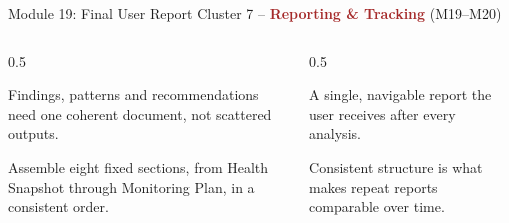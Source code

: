\documentclass[9pt,aspectratio=169]{beamer}
\begin{document}
\begin{frame}{Module 19: Final User Report}
\textcolor{black!55}{\scriptsize Cluster 7 -- \textcolor{brown}{\textbf{Reporting \& Tracking}} (M19--M20)}\\[2pt]
\begin{columns}[T,onlytextwidth]
\begin{column}{0.5\textwidth}
\begin{tcolorbox}[colback=blue!7,colframe=blue!55!black,title=\textbf{Motivation},boxrule=0.6pt,arc=1mm,left=5pt,right=5pt,top=3pt,bottom=3pt,fonttitle=\small]
\footnotesize Findings, patterns and recommendations need one coherent document, not scattered outputs.
\end{tcolorbox}
\vspace{5pt}
\begin{tcolorbox}[colback=teal!7,colframe=teal!55!black,title=\textbf{Method},boxrule=0.6pt,arc=1mm,left=5pt,right=5pt,top=3pt,bottom=3pt,fonttitle=\small]
\footnotesize Assemble eight fixed sections, from Health Snapshot through Monitoring Plan, in a consistent order.
\end{tcolorbox}
\end{column}
\begin{column}{0.5\textwidth}
\begin{tcolorbox}[colback=green!8,colframe=green!45!black,title=\textbf{Result},boxrule=0.6pt,arc=1mm,left=5pt,right=5pt,top=3pt,bottom=3pt,fonttitle=\small]
\footnotesize A single, navigable report the user receives after every analysis.
\end{tcolorbox}
\vspace{5pt}
\begin{tcolorbox}[colback=orange!10,colframe=orange!65!black,title=\textbf{Conclusion},boxrule=0.6pt,arc=1mm,left=5pt,right=5pt,top=3pt,bottom=3pt,fonttitle=\small]
\footnotesize Consistent structure is what makes repeat reports comparable over time.
\end{tcolorbox}
\end{column}
\end{columns}
\end{frame}
\end{document}
